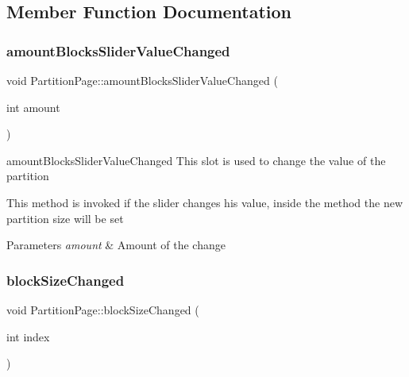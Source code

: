 \subsection{Member Function Documentation}
\mbox{\label{class_partition_page_a0160f5f4dd1dcc377dc7a2f1db732f24}} 
\subsubsection{\texorpdfstring{amount\+Blocks\+Slider\+Value\+Changed}{amountBlocksSliderValueChanged}}
{\footnotesize\ttfamily void Partition\+Page\+::amount\+Blocks\+Slider\+Value\+Changed (\begin{DoxyParamCaption}\item[{int}]{amount }\end{DoxyParamCaption})\hspace{0.3cm}{\ttfamily [slot]}}



amount\+Blocks\+Slider\+Value\+Changed This slot is used to change the value of the partition 

This method is invoked if the slider changes his value, inside the method the new partition size will be set 
\begin{DoxyParams}{Parameters}
{\em amount} & Amount of the change \\
\hline
\end{DoxyParams}
\mbox{\label{class_partition_page_aa90723be1956b54ce182cc64b3b4ce6f}} 
\subsubsection{\texorpdfstring{block\+Size\+Changed}{blockSizeChanged}}
{\footnotesize\ttfamily void Partition\+Page\+::block\+Size\+Changed (\begin{DoxyParamCaption}\item[{int}]{index }\end{DoxyParamCaption})\hspace{0.3cm}{\ttfamily [slot]}}



